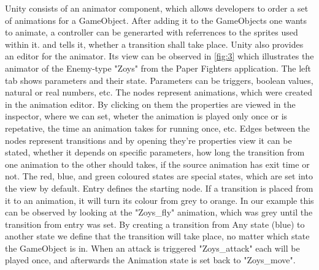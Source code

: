 Unity consists of an animator component, which allows developers to order a set of animations for a GameObject. After adding it to the GameObjects one wants to animate, a controller can be generarted with referrences to the sprites used within it. and tells it, whether a transition shall take place. Unity also provides an editor for the animator. Its view can be observed in \ref{fig:3} which illustrates the animator of the Enemy-type "Zoys" from the Paper Fighters application. The left tab shows parameters and their state. Parameters can be triggers, boolean values, natural or real numbers, etc. The nodes represent animations, which were created in the animation editor. By clicking on them the properties are viewed in the inspector, where we can set, wheter the animation is played only once or is repetative, the time an animation takes for running once, etc. Edges between the nodes represent transitions and by opening they're properties view it can be stated, whether it depends on specific parameters, how long the transition from one animation to the other should takes, if the source animation has exit time or not. The red, blue, and green coloured states are special states, which are set into the view by default. Entry defines the starting node. If a transition is placed from it to an animation, it will turn its colour from grey to orange. In our example this can be observed by looking at the "Zoys\_fly" animation, which was grey until the transition from entry was set. By creating a transition from Any state (blue) to another state we define that the transition will take place, no matter which state the GameObject is in.
When an attack is triggered "Zoys\_attack" each will be played once, and afterwards the Animation state is set back to "Zoys\_move". \cite{UNI}